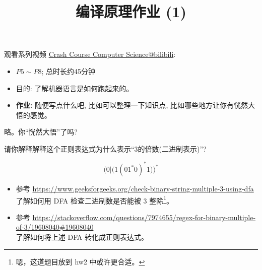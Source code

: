 \documentclass[a4paper, justified]{tufte-handout}
\title{编译原理作业 (1)}
\date{\zhtoday}
\begin{document}
	\maketitle
	\noplagiarism %
	\begin{abstract}
	\end{abstract}
	\beginrequired
	\begin{problem}[计算机系统基础]
		观看系列视频 \href{https://www.bilibili.com/video/BV1EW411u7th?}{Crash Course Computer Science@bilibili}:
		\begin{itemize}
			\item $P5 \sim P8$; 总时长约45分钟
			\item 目的: 了解机器语言是如何跑起来的。
			\item {\bf 作业:} 随便写点什么吧, 比如可以整理一下知识点, 比如哪些地方让你有恍然大悟的感觉。
		\end{itemize}
	\end{problem}

	\begin{solution}
	  略。你``恍然大悟''了吗?
	\end{solution}

	\begin{problem}[正则表达式]
		请你解释解释这个正则表达式为什么表示``3的倍数(二进制表示)''?

		\[
		\Big(0|\big(1(01^{\ast}0)^{\ast}1\big)\Big)^{\ast}
		\]

		\begin{center}
		\end{center}
	\end{problem}
	\begin{solution}
	\begin{itemize}
	  \item 参考 \url{https://www.geeksforgeeks.org/check-binary-string-multiple-3-using-dfa}\\
		了解如何用 DFA 检查二进制数是否能被 3 整除\footnote[]{
			嗯，这道题目放到 hw2 中或许更合适。
		}。
	  \item 参考 \url{https://stackoverflow.com/questions/7974655/regex-for-binary-multiple-of-3/19608040#19608040}\\
		了解如何将上述 DFA 转化成正则表达式。
	\end{itemize}
	\end{solution}
\end{document}
